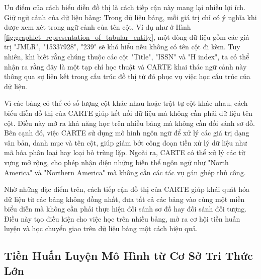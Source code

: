 \documentclass{article}
\begin{document}
Ưu điểm của cách biểu diễn đồ thị là cách tiếp cận này mang lại nhiều lợi ích. Giữ ngữ cảnh của dữ liệu bảng: Trong dữ liệu bảng, mỗi giá trị chỉ có ý nghĩa khi được xem xét trong ngữ cảnh của tên cột. Ví dụ như ở Hình \ref{fig:graphlet_representation_of_tabular_entity}, một dòng dữ liệu gồm các giá trị "JMLR", "15337928", "239" sẽ khó hiểu nếu không có tên cột đi kèm. Tuy nhiên, khi biết rằng chúng thuộc các cột "Title", "ISSN" và "H index", ta có thể nhận ra rằng đây là một tạp chí học thuật và CARTE khai thác ngữ cảnh này thông qua sự liên kết trong cấu trúc đồ thị từ đó phục vụ việc học cấu trúc của dữ liệu.

Vì các bảng có thể có số lượng cột khác nhau hoặc trật tự cột khác nhau, cách biểu diễn đồ thị của CARTE giúp kết nối dữ liệu mà không cần phải dữ liệu tên cột. Điều này mở ra khả năng học trên nhiều bảng mà không cần đối sánh sơ đồ. Bên cạnh đó, việc CARTE sử dụng mô hình ngôn ngữ để xử lý các giá trị dạng văn bản, danh mục và tên cột, giúp giảm bớt công đoạn tiền xử lý dữ liệu như mã hóa phân loại hay loại bỏ trùng lặp. Ngoài ra, CARTE có thể xử lý các từ vựng mở rộng, cho phép nhận diện những biến thể ngôn ngữ như "North America" và "Northern America" mà không cần các tác vụ gán ghép thủ công.

Nhờ những đặc điểm trên, cách tiếp cận đồ thị của CARTE giúp khái quát hóa dữ liệu từ các bảng không đồng nhất, đưa tất cả các bảng vào cùng một miền biểu diễn mà không cần phải thực hiện đối sánh sơ đồ hay đối sánh đối tượng. Điều này tạo điều kiện cho việc học trên nhiều bảng, mở ra cơ hội tiền huấn luyện và học chuyển giao trên dữ liệu bảng một cách hiệu quả.


\subsection{Tiền Huấn Luyện Mô Hình từ Cơ Sở Tri Thức Lớn}
\end{document}
